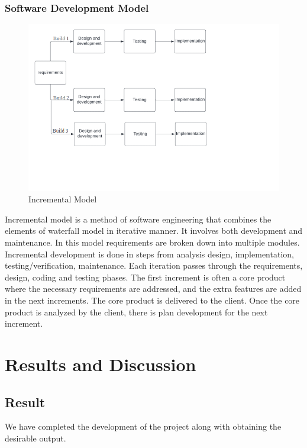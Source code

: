 \subsection{Software Development Model}
\vspace{-18pt}
 \begin{figure}[tbh] %
\begin{center}
	\includegraphics[width=6in]{images/sdlc1.png} 
	\caption{Incremental Model} %
	\label{Incremental Model} %
\end{center}
\end{figure}
Incremental model is a method of software engineering that combines the elements of waterfall model in iterative manner. It involves both development and maintenance. In this model requirements are broken down into multiple modules. Incremental development is done in steps from analysis design, implementation, testing/verification, maintenance. Each iteration passes through the requirements, design, coding and testing phases. The first increment is often a core product where the necessary requirements are addressed, and the extra features are added in the next increments. The core product is delivered to the client. Once the core product is analyzed by the client, there is plan development for the next increment.
\chapter{Results and Discussion}
\vspace{-18pt}
\section{Result}
\vspace{-18pt}
We have completed the development of the project along with obtaining the desirable output. 

